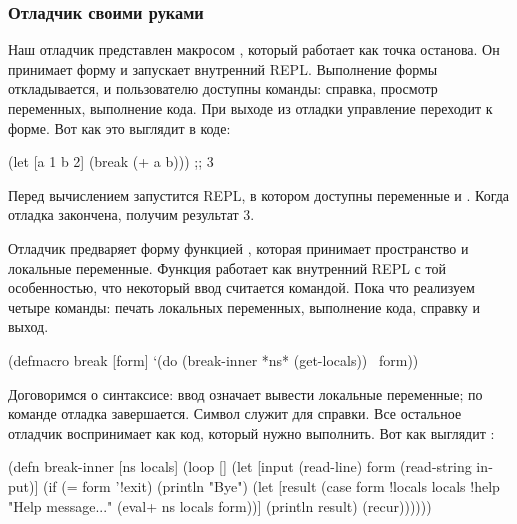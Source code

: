 \subsubsection{Отладчик своими руками}

Наш отладчик представлен макросом , который работает как точка останова. Он принимает форму и запускает внутренний REPL. Выполнение формы откладывается, и пользователю доступны команды: справка, просмотр переменных, выполнение кода. При выходе из отладки управление переходит к форме. Вот как это выглядит в коде:

\begin{english}
  \begin{clojure}
(let [a 1
      b 2]
  (break (+ a b)))
;; 3
  \end{clojure}
\end{english}

Перед вычислением  запустится REPL, в котором доступны переменные  и . Когда отладка закончена, получим результат 3.

Отладчик предваряет форму функцией , которая принимает пространство и локальные переменные. Функция  работает как внутренний REPL с той особенностью, что некоторый ввод считается командой. Пока что реализуем четыре команды: печать локальных переменных, выполнение кода, справку и выход.

\begin{english}
  \begin{clojure}
(defmacro break [form]
  `(do
     (break-inner *ns* (get-locals))
     ~form))
  \end{clojure}
\end{english}

Договоримся о синтаксисе: ввод  означает вывести локальные переменные; по команде  отладка завершается. Символ  служит для справки. Все остальное отладчик воспринимает как код, который нужно выполнить. Вот как выглядит :

\begin{english}
  \begin{clojure}
(defn break-inner [ns locals]
  (loop []
    (let [input (read-line)
          form (read-string input)]
      (if (= form '!exit)
        (println "Bye")
        (let [result
              (case form
                !locals locals
                !help "Help message..."
                (eval+ ns locals form))]
          (println result)
          (recur))))))
  \end{clojure}
\end{english}

